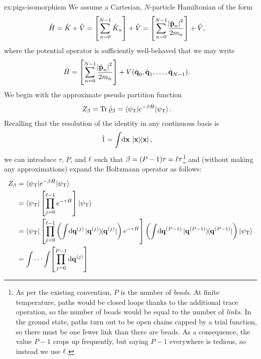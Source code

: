 \begin{DefAnswer}{ex:pigs-isomorphism}
	We assume a Cartesian, $N$-particle Hamiltonian of the form
	\begin{align}
		\hat{H}
		&= \hat{K} + \hat{V}
		= \left[ \sum_{n=0}^{N-1} \hat{K}_n \right] + \hat{V}
		= \left[ \sum_{n=0}^{N-1} \frac{\abs{\hat{\bm{\mathbf{p}}}_n}^2}{2 m_n} \right] + \hat{V},
	\end{align}
	where the potential operator is sufficiently well-behaved that we may write
	\begin{align}
		\hat{H}
		&= \left[ \sum_{n=0}^{N-1} \frac{\abs{\hat{\bm{\mathbf{p}}}_n}^2}{2 m_n} \right]
			+ V(\hat{\bm{\mathbf{q}}}_0, \hat{\bm{\mathbf{q}}}_1, \ldots, \hat{\bm{\mathbf{q}}}_{N-1}).
	\end{align}
	We begin with the approximate pseudo partition function
	\begin{align}
		Z_\beta
		&= \operatorname{Tr}{\hat{\varrho}_\beta}
		= \braket{\psi_\mathrm{T} | e^{-\beta \hat{H}} | \psi_\mathrm{T}}.
	\end{align}
	Recalling that the resolution of the identity in any continuous basis is
	\begin{align}
		\hat{1}
		&= \int\! \dif \vec{x} \, \ketbraself{\vec{x}},
	\end{align}
	we can introduce $\tau$, $P$, and $\ell$ such that $\beta = (P-1) \tau = \ell \tau$\footnote{
		As per the existing convention, $P$ is the number of \emph{beads}.
		At finite temperature, paths would be closed loops thanks to the additional trace operation, so the number of beads would be equal to the number of \emph{links}.
		In the ground state, paths turn out to be open chains capped by a trial function, so there must be one fewer link than there are beads.
		As a consequence, the value $P - 1$ crops up frequently, but saying $P - 1$ everywhere is tedious, so instead we use $\ell$.
	} and (without making any approximations) expand the Boltzmann operator as follows:
	\begin{subequations}
	\begin{align}
		Z_\beta
		&= \braket{\psiT | e^{-\beta \hat{H}} | \psiT} \\
		&= \braket{\psiT | \left[ \prod_{j=0}^{\links - 1} e^{-\tau \hat{H}} \right] | \psiT} \\
		&= \bra{\psiT}
			\left[
				\prod_{j=0}^{\links - 1}
					\left( \int\! \dif \vec{q}\bead{j} \ketbraself{\vec{q}\bead{j}} \right)
					e^{-\tau \hat{H}}
			\right]
			\left( \int\! \dif \vec{q}\bead{P-1} \ketbraself{\vec{q}\bead{P-1}} \right)
			\ket{\psiT} \\
		&= \idotsint\! \left[ \prod_{j=0}^{P-1} \dif \vec{q}\bead{j} \right]

\end{align}
\end{subequations}
\end{DefAnswer}
